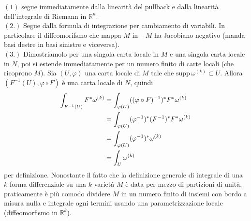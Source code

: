 \documentclass[oneside, 11pt]{amsbook}
\makeatletter
\newcommand{\0}{{(0)}}
\newcommand{\3}{{(3)}}
\theoremstyle{colonplain}
\theoremstyle{colondefinition}
\theoremstyle{colonremark}
\numberwithin{equation}{chapter}
\renewcommand{\proofname}{Dimostrazione}
\renewenvironment{proof}[1][\proofname]{\par
  \pushQED{\qed}%
  \normalfont \topsep6\p@\@plus6\p@\relax
  \trivlist
  \item[\hskip\labelsep\bfseries #1:]\ignorespaces
}{%
  \popQED\endtrivlist\@endpefalse
}
\makeatother
\begin{document}
\begin{proof} $(1)$ segue immediatamente dalla linearità del pullback e dalla linearità dell'integrale di Riemann in $\mathbb{R}^n$. \\
$(2.)$ Segue dalla formula di integrazione per cambiamento di variabili. In particolare il diffeomorifsmo che mappa $M$ in $-M$ ha Jacobiano negativo (manda basi destre in basi sinistre e viceversa). \\
$(3.)$ Dimostriamolo per una singola carta locale in $M$ e una singola carta locale in $N$, poi si estende immediatamente per un numero finito di carte locali (che ricoprono $M$). Sia $(U, \varphi)$ una carta locale di $M$ tale che $\mathrm{supp} \, \omega^{(k)} \subset U$. Allora $(F^{-1}(U), \varphi \circ F)$ è una carta locale di $N$, quindi
\begin{align}
    \int_{F^{-1}(U)} F^*\omega^{(k)} &= \int_{\varphi(U)} ((\varphi \circ F)^{-1})^*F^*\omega^{(k)} \notag \\
    &= \int_{\varphi(U)} (\varphi^{-1})^*(F^{-1})^*F^*\omega^{(k)} \notag \\
    &= \int_{\varphi(U)} (\varphi^{-1})^*\omega^{(k)} \notag \\
    &= \int_U \omega^{(k)}
\end{align}
per definizione.
\end{proof}
Nonostante il fatto che la definizione generale di integrale di una $k$-forma differenziale su una $k$-varietà $M$ è data per mezzo di partizioni di unità, praticamente è più comodo dividere $M$ in un numero finito di insiemi con bordo a misura nulla e integrale ogni termini usando una parametrizzazione locale (diffeomorfismo in $\mathbb{R}^k$).
\end{document}
